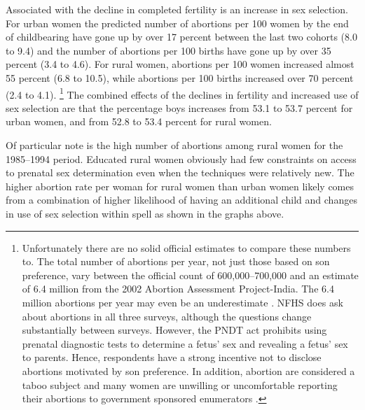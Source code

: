 \documentclass[12pt,letterpaper]{article}
\begin{document}
Associated with the decline in completed fertility is an increase in sex selection.
For urban women the predicted number of abortions per 100 women by the end of
childbearing have gone up by over 17 percent between the last two cohorts (8.0 to 9.4) 
and the number of abortions per 100 births have gone up by over 35 percent (3.4 to 4.6).
For rural women, abortions per 100 women increased almost 55 percent (6.8 to 10.5), 
while abortions per 100 births increased over 70 percent (2.4 to 4.1).%
\footnote{
Unfortunately there are no solid official estimates to compare these numbers to.
The total number of abortions per year, not just those based on son preference, vary 
between the official count of 600,000--700,000 
and an estimate of 6.4 million from the 2002 Abortion Assessment Project-India.
The 6.4 million abortions per year may even be an underestimate \citep{Stillman2014}.
NFHS does ask about abortions in all three surveys, although the questions change 
substantially between surveys.
However, the PNDT act prohibits using prenatal diagnostic tests to determine a fetus' sex
and revealing a fetus' sex to parents.
Hence, respondents have a strong incentive not to disclose abortions motivated by son 
preference. 
In addition, abortion are considered a taboo subject and many women are unwilling or 
uncomfortable reporting their abortions to government sponsored enumerators 
\citep{Rossier2003,Stillman2014}.
}
The combined effects of the declines in fertility and increased use of sex selection
are that the percentage boys increases from 53.1 to 53.7 percent for urban
women, and from 52.8 to 53.4 percent for rural women.

Of particular note is the high number of abortions among rural women for the 
1985--1994 period.
Educated rural women obviously had few constraints on access to 
prenatal sex determination even when the techniques were relatively new.
The higher abortion rate per woman for rural women than urban women likely comes from
a combination of higher likelihood of having an additional child and changes in use of 
sex selection within spell as shown in the graphs above. 
\end{document}

